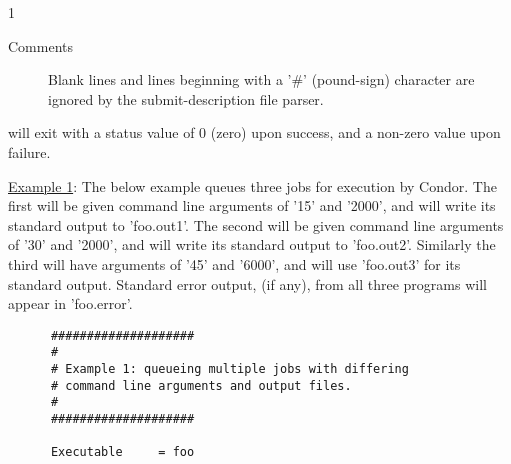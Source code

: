 \begin{ManPage}{\label{man-condor-submit}}{1}
\begin{description}
\item[Comments] Blank lines and lines beginning with a '\#' (pound-sign)
character are ignored by the submit-description file parser. 

\end{description}


\begin{Options}




\end{Options}

\ExitStatus

 will exit with a status value of 0 (zero) upon success, and a
non-zero value upon failure.

\Examples

\underline{Example 1}: The below example queues three jobs for
execution by Condor. The first will be given command line arguments of
'15' and '2000', and will write its standard output to 'foo.out1'. The
second will be given command line arguments of '30' and '2000', and will
write its standard output to 'foo.out2'. Similarly the third will have
arguments of '45' and '6000', and will use 'foo.out3' for its standard
output. Standard error output, (if any), from all three programs will
appear in 'foo.error'.

\begin{verbatim}
      ####################
      #
      # Example 1: queueing multiple jobs with differing
      # command line arguments and output files.
      #                                                                      
      ####################                                                   
                                                                         
      Executable     = foo                                                   
                                                                         

\end{verbatim}
\end{ManPage}
